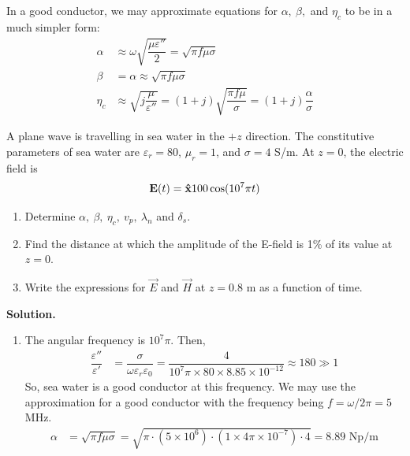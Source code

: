 In a good conductor, we may approximate equations for $\alpha,\ \beta,$ and $\eta_c$ to be in a much simpler form: 
\begin{subequations}
\begin{align}
    \alpha &\approx \omega\sqrt{\dfrac{\mu\varepsilon''}{2}} = \sqrt{\pi f\mu\sigma} \\ 
    \beta &= \alpha \approx \sqrt{\pi f \mu\sigma} \\ 
    \eta_c &\approx \sqrt{j\dfrac{\mu}{\varepsilon''}} = (1+j)\sqrt{\dfrac{\pi f\mu}{\sigma}} = (1+j) \dfrac{\alpha}{\sigma}
\end{align}
\end{subequations}

\begin{example}
    A plane wave is travelling in sea water in the $+z$ direction. The constitutive parameters of sea water are $\varepsilon_r=80$, $\mu_r=1$, and $\sigma=4$ S/m. At $z=0$, the electric field is 
    \begin{align*}
        \boldsymbol{\mathrm{E}}(t) = \boldsymbol{{\mathrm{\hat{x}}}} 100\cos(10^7 \pi t)
    \end{align*}
    \begin{enumerate}[label=(\alph*), itemsep=0pt]
        \item Determine $\alpha,\ \beta,\ \eta_c,\ v_p,\ \lambda_n$ and $\delta_s$. 
        \item Find the distance at which the amplitude of the E-field is 1\% of its value at $z=0$. 
        \item Write the expressions for $\vec{E}$ and $\vec{H}$ at $z=0.8$ m as a function of time. 
    \end{enumerate}
    \textbf{Solution.} 
    \begin{enumerate}[label=(\alph*), itemsep=0pt]
        \item The angular frequency is $10^7 \pi$. Then, 
            \begin{align*}
                \dfrac{\varepsilon''}{\varepsilon'} &= \dfrac{\sigma}{\omega\varepsilon_r\varepsilon_0} = \dfrac{4}{10^7\pi \times 80 \times 8.85\times10^{-12}} \approx 180 \gg 1 
            \end{align*}
            So, sea water is a good conductor at this frequency. We may use the approximation for a good conductor with the frequency being $f=\omega/2\pi = 5$ MHz. 
            \begin{align*}
                \alpha &= \sqrt{\pi f \mu \sigma} = \sqrt{\pi \cdot (5\times10^6) \cdot (1\times 4\pi\times10^{-7}) \cdot 4} = 8.89 \text{ Np/m} \\ 

\end{align*}
\end{enumerate}
\end{example}

